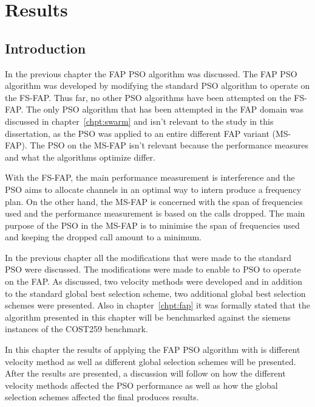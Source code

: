 \chapter{Results}
\label{chpt:results}
\section{Introduction}
In the previous chapter the FAP PSO algorithm was discussed. The FAP PSO algorithm was developed by modifying the standard PSO algorithm to operate on the FS-FAP. Thus far, no other PSO algorithms have been attempted on the FS-FAP. The only PSO algorithm that has been attempted in the FAP domain was discussed in chapter~\ref{chpt:swarm} and isn't relevant to the study in this dissertation, as the PSO was applied to an entire different FAP variant (MS-FAP). The PSO on the MS-FAP isn't relevant because the performance measures and what the algorithms optimize differ.

With the FS-FAP, the main performance measurement is interference and the PSO aims to allocate channels in an optimal way to intern produce a frequency plan. On the other hand, the MS-FAP is concerned with the span of frequencies used and the performance measurement is based on the calls dropped. The main purpose of the PSO in the MS-FAP is to minimise the span of frequencies used and keeping the dropped call amount to a minimum.

In the previous chapter all the modifications that were made to the standard PSO were discussed. The modifications were made to enable to PSO to operate on the FAP. As discussed, two velocity methods were developed and in addition to the standard global best selection scheme, two additional global best selection schemes were presented. Also in chapter~\ref{chpt:fap} it was formally stated that the algorithm presented in this chapter will be benchmarked against the siemens instances of the COST259 benchmark.

In this chapter the results of applying the FAP PSO algorithm with is different velocity method as well as different global selection schemes will be presented. After the results are presented, a discussion will follow on how the different velocity methods affected the PSO performance as well as how the global selection schemes affected the final produces results.


